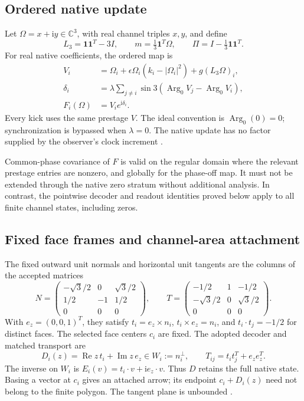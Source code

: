 \documentclass[11pt,a4paper]{article}
\numberwithin{equation}{section}
\theoremstyle{definition}
\theoremstyle{remark}
\newcommand{\C}{\mathbb C}
\newcommand{\iu}{\mathrm i}
\newcommand{\one}{\mathbf 1}
\newcommand{\eps}{\epsilon}
\newcommand{\Argz}{\operatorname{Arg}_0}
\newcommand{\re}{\operatorname{Re}}
\newcommand{\im}{\operatorname{Im}}
\begin{document}
\subsection{Ordered native update}
Let $\Omega=x+\iu y\in\C^3$, with real channel triples $x,y$, and define
\begin{equation}
L_3=\one\one^T-3I,
\qquad m=\tfrac13\one^T\Omega,
\qquad \Pi=I-\tfrac13\one\one^T.
\end{equation}
For real native coefficients, the ordered map is
\begin{align}
V_i&=\Omega_i+\eps\Omega_i(k_i-|\Omega_i|^2)
                   +g(L_3\Omega)_i,\label{eq:pre}\\
\delta_i&=\lambda\sum_{j\ne i}
           \sin 3(\Argz V_j-\Argz V_i),\label{eq:kicks}\\
F_i(\Omega)&=V_i e^{\iu\delta_i}.\label{eq:post}
\end{align}
Every kick uses the same prestage $V$. The ideal convention is
$\Argz(0)=0$; synchronization is bypassed when $\lambda=0$. The native
update has no factor supplied by the observer's clock increment
\cite{Collective,Central}.

Common-phase covariance of $F$ is valid on the regular domain where the
relevant prestage entries are nonzero, and globally for the phase-off map.
It must not be extended through the native zero stratum without additional
analysis. In contrast, the pointwise decoder and readout identities proved
below apply to all finite channel states, including zeros.

\subsection{Fixed face frames and channel-area attachment}
The fixed outward unit normals and horizontal unit tangents are the columns
of the accepted matrices
\begin{equation}\label{eq:frames}
N=\begin{pmatrix}
-\sqrt3/2&0&\sqrt3/2\\
1/2&-1&1/2\\0&0&0
\end{pmatrix},\qquad
T=\begin{pmatrix}
-1/2&1&-1/2\\
-\sqrt3/2&0&\sqrt3/2\\0&0&0
\end{pmatrix}.
\end{equation}
With $e_z=(0,0,1)^T$, they satisfy
$t_i=e_z\times n_i$, $t_i\times e_z=n_i$, and
$t_i\cdot t_j=-1/2$ for distinct faces. The selected face centers $c_i$ are
fixed. The adopted decoder and matched transport are
\begin{equation}\label{eq:decoder}
D_i(z)=\re z\,t_i+\im z\,e_z\in W_i:=n_i^\perp,
\qquad T_{ij}=t_it_j^T+e_ze_z^T.
\end{equation}
The inverse on $W_i$ is
$E_i(v)=t_i\cdot v+\iu e_z\cdot v$. Thus $D$ retains the full native state.
Basing a vector at $c_i$ gives an attached arrow; its endpoint $c_i+D_i(z)$
need not belong to the finite polygon. The tangent plane is unbounded
\cite{Attachment}.
\end{document}

